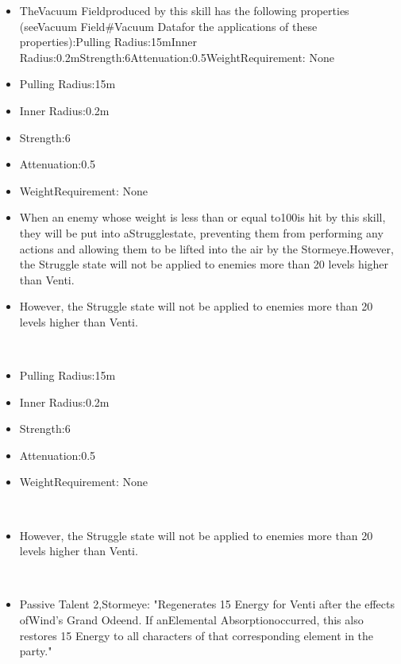 \documentclass[a4paper,12pt]{article}
\begin{document}
\begin{itemize}
\item TheVacuum Fieldproduced by this skill has the following properties (seeVacuum Field#Vacuum Datafor the applications of these properties):Pulling Radius:15mInner Radius:0.2mStrength:6Attenuation:0.5WeightRequirement: None
\item Pulling Radius:15m
\item Inner Radius:0.2m
\item Strength:6
\item Attenuation:0.5
\item WeightRequirement: None
\item When an enemy whose weight is less than or equal to100is hit by this skill, they will be put into aStrugglestate, preventing them from performing any actions and allowing them to be lifted into the air by the Stormeye.However, the Struggle state will not be applied to enemies more than 20 levels higher than Venti.
\item However, the Struggle state will not be applied to enemies more than 20 levels higher than Venti.
\end{itemize}\\ \par \vspace{0.5cm}

\begin{itemize}
\item Pulling Radius:15m
\item Inner Radius:0.2m
\item Strength:6
\item Attenuation:0.5
\item WeightRequirement: None
\end{itemize}\\ \par \vspace{0.5cm}

\begin{itemize}
\item However, the Struggle state will not be applied to enemies more than 20 levels higher than Venti.
\end{itemize}\\ \par \vspace{0.5cm}

\begin{itemize}
\item Passive Talent 2,Stormeye: "Regenerates 15 Energy for Venti after the effects ofWind's Grand Odeend. If anElemental Absorptionoccurred, this also restores 15 Energy to all characters of that corresponding element in the party."
\end{itemize}\\ \par \vspace{0.5cm}
\end{document}
